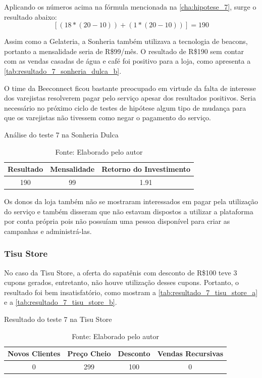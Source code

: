Aplicando os números acima na fórmula mencionada na \autoref{cha:hipotese_7}, surge o resultado abaixo:
\[[(18 * (20 - 10)) + (1 * (20 - 10))] = 190\]

Assim como a Gelateria, a Sonheria também utilizava a tecnologia de beacons, portanto a mensalidade seria de R\$99/mês. O resultado de R\$190 sem contar com as vendas casadas de água e café foi positivo para a loja, como apresenta a \autoref{tab:resultado_7_sonheria_dulca_b}.

O time da Beeconnect ficou bastante preocupado em virtude da falta de interesse dos varejistas resolverem pagar pelo serviço apesar dos resultados positivos. Seria necessário no próximo ciclo de testes de hipótese algum tipo de mudança para que os varejistas não tivessem como negar o pagamento do serviço.

\begin{table}[H]
\centering
\caption{Análise do teste 7 na Sonheria Dulca}
\label{tab:resultado_7_sonheria_dulca_b}
\begin{tabular}{|c|c|c|}
\hline
Resultado & Mensalidade & Retorno do Investimento \\ \hline
190             & 99          &   1.91 \\ \hline
\end{tabular}
\caption* {Fonte: Elaborado pelo autor}    
\end{table}

Os donos da loja também não se mostraram interessados em pagar pela utilização do serviço e também disseram que não estavam dispostos a utilizar a plataforma por conta própria pois não possuíam uma pessoa disponível para criar as campanhas e administrá-las.

\subsubsection{Tisu Store}
\label{cha:resultado_tisu_store}
No caso da Tisu Store, a oferta do sapatênis com desconto de R\$100 teve 3 cupons gerados, entretanto, não houve utilização desses cupons. Portanto, o resultado foi bem insatisfatório, como mostram a \autoref{tab:resultado_7_tisu_store_a} e a \autoref{tab:resultado_7_tisu_store_b}.


\begin{table}[H]
\centering
\caption{Resultado do teste 7 na Tisu Store}
\label{tab:resultado_7_tisu_store_a}
\begin{tabular}{|c|c|c|c|}
\hline
Novos Clientes & Preço Cheio & Desconto & Vendas Recursivas \\ \hline
0             & 299          & 100        & 0 \\  \hline
\end{tabular}
\caption* {Fonte: Elaborado pelo autor}    
\end{table}


